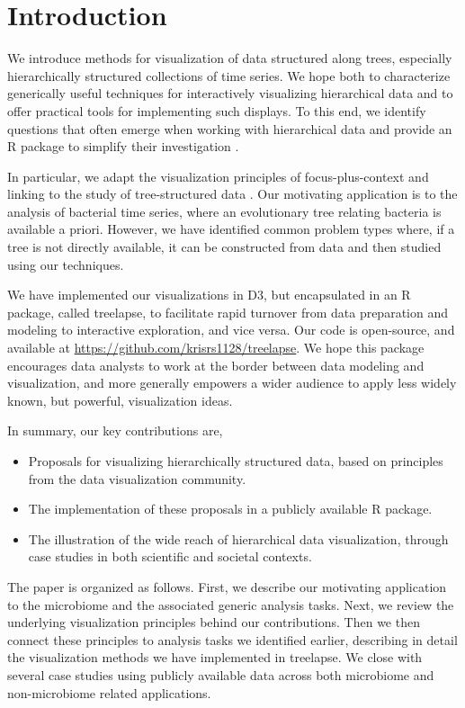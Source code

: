 \documentclass[12pt]{article}
\begin{document}
\newpage
{} %

\section{Introduction}\label{introduction}

We introduce methods for visualization of data structured along trees,
especially hierarchically structured collections of time series. We hope both to
characterize generically useful techniques for interactively visualizing
hierarchical data and to offer practical tools for implementing such displays.
To this end, we identify questions that often emerge when working with
hierarchical data and provide an R package to simplify their investigation
\citep{ihaka1996r}.

In particular, we adapt the visualization principles of focus-plus-context and
linking to the study of tree-structured data \citep{buja1996interactive,
  becker1987brushing}. Our motivating application is to the analysis of
bacterial time series, where an evolutionary tree relating bacteria is available
a priori. However, we have identified common problem types where, if a tree is
not directly available, it can be constructed from data and then studied using
our techniques.

We have implemented our visualizations in D3, but encapsulated in an R package,
called treelapse, to facilitate rapid turnover from data preparation and
modeling to interactive exploration, and vice versa. Our code is open-source,
and available at \url{https://github.com/krisrs1128/treelapse}. We hope this
package encourages data analysts to work at the border between data modeling and
visualization, and more generally empowers a wider audience to apply less widely
known, but powerful, visualization ideas.

In summary, our key contributions are,
\begin{itemize}
\item Proposals for visualizing hierarchically structured data, based on
  principles from the data visualization community.
\item The implementation of these proposals in a publicly available R package.
\item The illustration of the wide reach of hierarchical data visualization,
  through case studies in both scientific and societal contexts.
\end{itemize}

The paper is organized as follows. First, we describe our motivating application
to the microbiome and the associated generic analysis tasks. Next, we review the
underlying visualization principles behind our contributions. Then we then
connect these principles to analysis tasks we identified earlier, describing in
detail the visualization methods we have implemented in treelapse. We close with
several case studies using publicly available data across both microbiome and
non-microbiome related applications.
\end{document}
